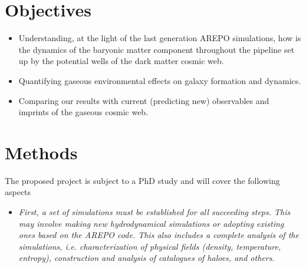 \documentclass[a4,useAMS,usenatbib,usegraphicx,12pt]{article}
\begin{document}


\section{Objectives}


\begin{itemize}

\item[\checkmark] Understanding, at the light of the last generation AREPO 
simulations, how is the dynamics of the baryonic matter component throughout
the pipeline set up by the potential wells of the dark matter cosmic web.

\item[\checkmark] Quantifying gaseous environmental effects on galaxy formation
and dynamics.

\item[\checkmark] Comparing our results with current (predicting new) observables 
and imprints of the gaseous cosmic web.


\end{itemize}



\section{Methods}


The proposed project is subject to a PhD study and will cover the following 
aspects

\begin{itemize}

\item[\checkmark] \textit{First, a set of simulations must be established for 
all succeeding steps. This may involve making new hydrodynamical simulations or 
adopting existing ones based on the AREPO code. This also includes a complete 
analysis of the simulations, i.e. characterization of physical fields (density, 
temperature, entropy), construction and analysis of catalogues of haloes, and
others.}

\end{itemize}
\end{document}
